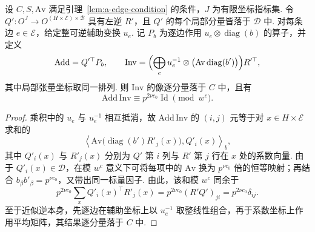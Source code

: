 \begin{lemma}[边配对的近似逆]
\label{lem:a-edge-pairing-near-inverse}
\emitthmsource
设 $C,S,\mathrm{Av}$ 满足引理~\ref{lem:a-edge-condition} 的条件，$J$ 为有限坐标指标集. 令 $Q':O^J\to O^{(H\times\mathcal E)\times\mathcal B}$ 具有左逆 $R'$，且 $Q'$ 的每个局部分量皆落于 $\mathcal D$ 中. 对每条边 $e\in\mathcal E$，给定整可逆辅助变换 $u_e$. 记 $P_b$ 为逐边作用 $u_e\otimes\operatorname{diag}(b)$ 的算子，并定义
\[
 \mathrm{Add}=Q'^\top P_b,\qquad
 \mathrm{Inv}=\Bigl(\bigoplus_e
          u_e^{-1}\otimes\bigl(\mathrm{Av}\operatorname{diag}(b')\bigr)\Bigr)R'^\top ,
\]
其中局部张量坐标取同一排列. 则 $\mathrm{Inv}$ 的像逐分量落于 $C$ 中，且有
\[
 \mathrm{Add}\,\mathrm{Inv}\equiv p^{2\nu c_0}\operatorname{Id}
         \pmod{w^c}.
\]
\end{lemma}
\begin{proof}
乘积中的 $u_e$ 与 $u_e^{-1}$ 相互抵消，故 $\mathrm{Add}\,\mathrm{Inv}$ 的 $(i,j)$ 元等于对 $x\in H\times\mathcal E$ 求和的
\[
 \left\langle\mathrm{Av}\bigl(\operatorname{diag}(b')R'_j(x)\bigr),
                      Q'_i(x)\right\rangle_b ,
\]
其中 $Q'_i(x)$ 与 $R'_j(x)$ 分别为 $Q'$ 第 $i$ 列与 $R'$ 第 $j$ 行在 $x$ 处的系数向量. 由于 $Q'_i(x)\in\mathcal D$，在模 $w^c$ 意义下可将每项中的 $\mathrm{Av}$ 换为 $p^{\nu c_0}$ 倍的恒等映射；再结合 $b_\beta b'_\beta=p^{\nu c_0}$，又带出同一标量因子. 由此，该和模 $w^c$ 同余于
\[
 p^{2\nu c_0}\sum_x Q'_i(x)^\top R'_j(x)
    =p^{2\nu c_0}(R'Q')_{ji}
    =p^{2\nu c_0}\delta_{ij}.
\]
至于近似逆本身，先逐边在辅助坐标上以 $u_e^{-1}$ 取整线性组合，再于系数坐标上作用平均矩阵，其结果逐分量落于 $C$ 中.
\end{proof}

